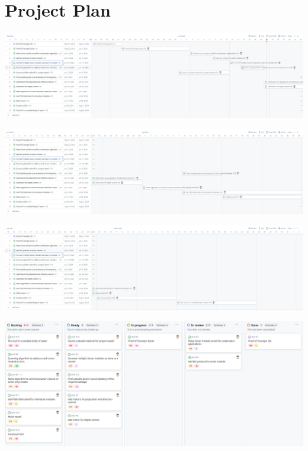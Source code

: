 \documentclass[11pt,a4paper,titlepage]{report}
\begin{document}
	\chapter{Project Plan}\label{appendix:project_plan}
	\begin{center}
		\label{picture:gaant1}
		\includegraphics[scale=0.15]{assets/gannt_start-june22.png}
	\end{center}
	\begin{center}
		\label{picture:gaant2}
		\includegraphics[scale=0.15]{assets/gaant_june22-july28.png}
	\end{center}
	\begin{center}
		\label{picture:gaant3}
		\includegraphics[scale=0.15]{assets/gaant_july28-sept2.png}
	\end{center}
	\begin{center}
		\label{picture:backlog}
		\includegraphics[scale=0.2]{assets/backlog.png}
	\end{center}
\end{document}
